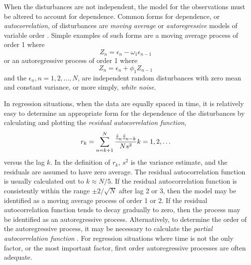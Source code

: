 When the disturbances are not independent, the
model for the observations must be altered to account for
dependence.
Common forms for dependence, or {\em autocorrelation}, of
disturbances are {\em moving average\/}
or {\em autoregressive\/}
models of variable order \cite{box:jenk:1976}.
Simple examples of such forms are a moving average process of
order 1 where
$$
Z_n = \epsilon_n - \omega_1 \epsilon_{n-1}
$$
or an autoregressive process of order 1 where
$$
Z_n = \epsilon_n + \phi_1 Z_{n-1}
$$
and the $\epsilon_n , n = 1, 2 ,\ldots, N$, are independent random
disturbances with zero mean and constant variance,
or more simply, {\em white noise}.

In regression situations,
when the data are equally spaced in time, it is relatively easy
to determine an appropriate form for the dependence of the
disturbances by calculating and plotting the {\em residual
autocorrelation function},
$$
r_k = \sum_{n=k+1}^N
{ \hat z_n  \hat z_{n-k}   \over N s^2 }   
k = 1,  2,\ldots
$$
versus the lag $k$.
In the definition of $r_{k}$, $s^{2}$ is the
variance estimate,
and the residuals are assumed to have zero average.
The residual autocorrelation function is usually calculated
out to $ k  \approx  N / 5 $.
If the residual autocorrelation function is consistently within
the range $\pm 2 / \sqrt N $ after lag 2 or 3, then
the model may be identified as a moving average process of order
1 or 2.
If the residual autocorrelation function tends to decay gradually
to zero, then the process may be identified as an autoregressive
process.
Alternatively, to determine the order of the autoregressive
process, it may be necessary to calculate the
{\em partial autocorrelation function\/}
\cite{box:jenk:1976}.
For regression situations where time is not the only
factor, or the most important factor, first order
autoregressive processes are often adequate.

